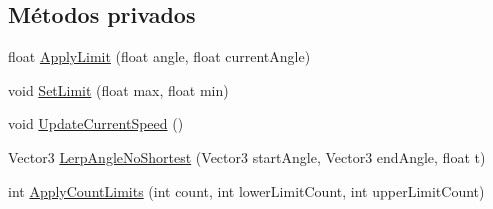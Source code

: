 \subsection*{Métodos privados}
\begin{DoxyCompactItemize}
\item 
float \mbox{\hyperlink{class_articulation_aeea905ad3cc4497d1dfac2695835d459}{Apply\+Limit}} (float angle, float current\+Angle)
\item 
void \mbox{\hyperlink{class_articulation_ac3ed162898a61f33eb8b9e74c9e46389}{Set\+Limit}} (float max, float min)
\item 
void \mbox{\hyperlink{class_articulation_a88aec688de1ef2c8b019709865be4383}{Update\+Current\+Speed}} ()
\item 
Vector3 \mbox{\hyperlink{class_articulation_a434d6e06e4387f7b0c3feb445895cfea}{Lerp\+Angle\+No\+Shortest}} (Vector3 start\+Angle, Vector3 end\+Angle, float t)
\item 
int \mbox{\hyperlink{class_articulation_a17400ddd138629071a5c240bba86c8f2}{Apply\+Count\+Limits}} (int count, int lower\+Limit\+Count, int upper\+Limit\+Count)
\end{DoxyCompactItemize}
